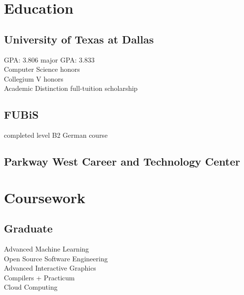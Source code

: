 \documentclass[letterpaper]{deedy-resume} %
\begin{document}
\lastupdated %



\begin{minipage}[t]{0.33\textwidth} %


\section{Education} 
	
	\subsection{University of Texas at Dallas}
		\subtitle{BS in Computer Science}
		GPA: 3.806 \hfill major GPA: 3.833 \hspace*{\fill} \\
		Computer Science honors\\
		Collegium V honors\\
		Academic Distinction full-tuition scholarship\\
	\sectionspace
	
	\subsection{FUBiS}
		\subtitle{Free University of Berlin international summer program}
		completed level B2 German course
	\sectionspace
	
	\subsection{Parkway West Career and Technology Center}
		\subtitle{Certificate in Computer Technology}
	\sectionspace


\section{Coursework}

\subsection{Graduate}

Advanced Machine Learning \\
Open Source Software Engineering \\
Advanced Interactive Graphics \\
Compilers + Practicum \\
Cloud Computing


\end{minipage}
\end{document}

